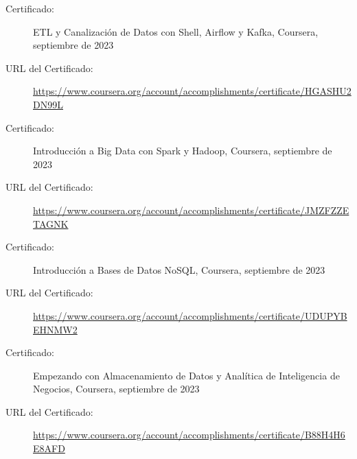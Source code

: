 \documentclass[a4paper,10pt]{article}
\begin{document}
\begin{description}
    \item[Certificado:] ETL y Canalización de Datos con Shell, Airflow y Kafka, Coursera, septiembre de 2023
    \item[URL del Certificado:] \url{https://www.coursera.org/account/accomplishments/certificate/HGASHU2DN99L}
\end{description}
\vspace{1pt} %
\begin{description}
  \item[Certificado:] Introducción a Big Data con Spark y Hadoop, Coursera, septiembre de 2023
  \item[URL del Certificado:] \url{https://www.coursera.org/account/accomplishments/certificate/JMZFZZETAGNK}
\end{description}
\vspace{1pt} %
\begin{description}
  \item[Certificado:] Introducción a Bases de Datos NoSQL, Coursera, septiembre de 2023
  \item[URL del Certificado:] \url{https://www.coursera.org/account/accomplishments/certificate/UDUPYBEHNMW2}
\end{description}
\vspace{1pt} %
\begin{description}
  \item[Certificado:] Empezando con Almacenamiento de Datos y Analítica de Inteligencia de Negocios, Coursera, septiembre de 2023
  \item[URL del Certificado:] \url{https://www.coursera.org/account/accomplishments/certificate/B88H4H6E8AFD}
\end{description}
\end{document}
